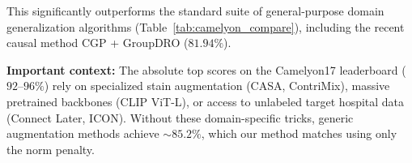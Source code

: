 \documentclass[11pt,a4paper]{article}
\begin{document}
\begin{table}[ht]
\centering
\caption{Camelyon17 test OOD accuracy per seed.}
\label{tab:camelyon_seeds}
\end{table}

This significantly outperforms the standard suite of general-purpose domain generalization algorithms (Table~\ref{tab:camelyon_compare}), including the recent causal method CGP + GroupDRO ($81.94\%$).

\begin{table}[ht]
\centering
\caption{Camelyon17: comparison against general-purpose methods.}
\label{tab:camelyon_compare}
\end{table}

\textbf{Important context:} The absolute top scores on the Camelyon17 leaderboard ($92$--$96\%$) rely on specialized stain augmentation (CASA, ContriMix), massive pretrained backbones (CLIP ViT-L), or access to unlabeled target hospital data (Connect Later, ICON). Without these domain-specific tricks, generic augmentation methods achieve $\sim85.2\%$, which our method matches using only the norm penalty.
\end{document}
